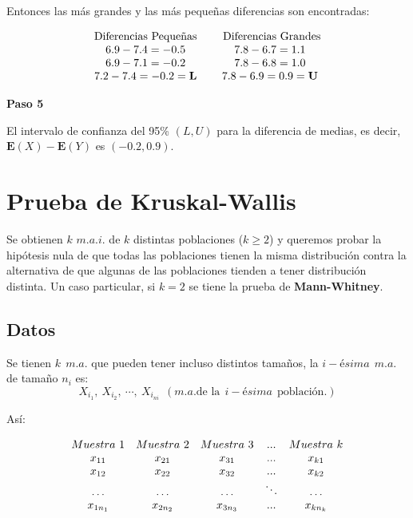 \documentclass[
  a4paper,
  oneside,
  openany]{book}
\begin{document}
Entonces las más grandes y las más pequeñas diferencias son encontradas:

\[
\begin{array}{c c c c}
\mbox{Diferencias Pequeñas} & & \mbox{ Diferencias Grandes} \\
6.9 - 7.4 = -0.5 & & 7.8 - 6.7 = 1.1\\
6.9 - 7.1 = -0.2 & & 7.8 - 6.8 = 1.0\\
7.2 - 7.4 = -0.2 = \textbf{L} & & 7.8 - 6.9 = 0.9 = \textbf{U}\\
\end{array}
\]

\textbf{Paso 5}

El intervalo de confianza del 95\% \((L,U)\) para la diferencia de medias, es decir, \(\mathbf{E}(X)-\mathbf{E}(Y)\) es \((-0.2,0.9)\).

\hypertarget{prueba-de-kruskal-wallis}{%
\chapter{Prueba de Kruskal-Wallis}\label{prueba-de-kruskal-wallis}}

Se obtienen \(k\) \(m.a.i.\) de \(k\) distintas poblaciones (\(k\geq 2\)) y queremos probar la hipótesis nula de que todas las poblaciones tienen la misma distribución contra la alternativa de que algunas de las poblaciones tienden a tener distribución distinta.
Un caso particular, si \(k=2\) se tiene la prueba de \textbf{Mann-Whitney}.

\hypertarget{datos-7}{%
\section{Datos}\label{datos-7}}

Se tienen \(k\ \ m.a.\) que pueden tener incluso distintos tamaños, la \(i-ésima\ \ m.a.\) de tamaño \(n_{i}\) es:
\[X_{i_1},\ X_{i_2},\ \cdots, \ X_{i_{ni}} \ \ (m.a. \mbox{de la} \ \ i-ésima \ \ \mbox{población.})\]

Así:

\[
\begin{array}{c c c c c} 
Muestra \ 1&Muestra\ 2&Muestra\ 3&...&Muestra\ k \\
x_{11}&x_{21}&x_{31}&...&x_{k1}\\
x_{12}&x_{22}&x_{32}&...&x_{k2}\\
\ldots&\ldots&\ldots&\ddots&\ldots\\
x_{1n_1}&x_{2n_2}&x_{3n_3}&...&x_{kn_k}\\
\end{array}
\]
\end{document}

